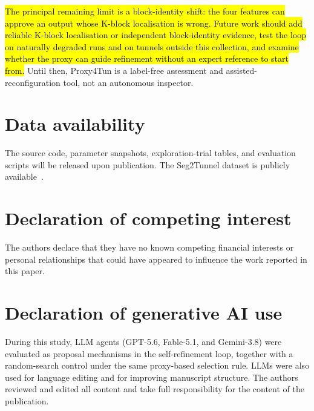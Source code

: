 \documentclass[a4paper,fleqn]{cas-dc}
\begin{document}
{\hl{The principal remaining limit is a block-identity shift: the four features can approve an output whose K-block localisation is wrong. Future work should add reliable K-block localisation or independent block-identity evidence, test the loop on naturally degraded runs and on tunnels outside this collection, and examine whether the proxy can guide refinement without an expert reference to start from.} Until then, Proxy4Tun is a label-free assessment and assisted-reconfiguration tool, not an autonomous inspector.


\section*{Data availability}

The source code, parameter snapshots, exploration-trial tables, and evaluation scripts will be released upon publication. The Seg2Tunnel dataset is publicly available~\cite{lin2024seg2tunnel}.

\section*{Declaration of competing interest}

The authors declare that they have no known competing financial interests or personal relationships that could have appeared to influence the work reported in this paper.

\section*{Declaration of generative AI use}

During this study, LLM agents (GPT-5.6, Fable-5.1, and Gemini-3.8) were evaluated as proposal mechanisms in the self-refinement loop, together with a random-search control under the same proxy-based selection rule. LLMs were also used for language editing and for improving manuscript structure. The authors reviewed and edited all content and take full responsibility for the content of the publication.


}
\end{document}
